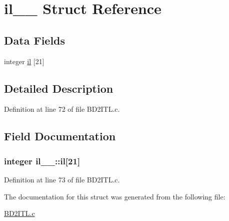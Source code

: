 \hypertarget{structil__1__}{}\section{il\+\_\+\_\+ Struct Reference}
\label{structil__1__}
\subsection*{Data Fields}
\begin{DoxyCompactItemize}
\item 
integer \hyperlink{structil__1___a15bc018d265dff806aa4987d838fe2ad}{il} \mbox{[}21\mbox{]}
\end{DoxyCompactItemize}


\subsection{Detailed Description}


Definition at line 72 of file B\+D2\+I\+T\+L.\+c.



\subsection{Field Documentation}
\subsubsection[{\texorpdfstring{il}{il}}]{\setlength{\rightskip}{0pt plus 5cm}integer il\+\_\+\_\+\+::il\mbox{[}21\mbox{]}}\hypertarget{structil__1___a15bc018d265dff806aa4987d838fe2ad}{}\label{structil__1___a15bc018d265dff806aa4987d838fe2ad}


Definition at line 73 of file B\+D2\+I\+T\+L.\+c.



The documentation for this struct was generated from the following file\+:\begin{DoxyCompactItemize}
\item 
\hyperlink{BD2ITL_8c}{B\+D2\+I\+T\+L.\+c}\end{DoxyCompactItemize}
